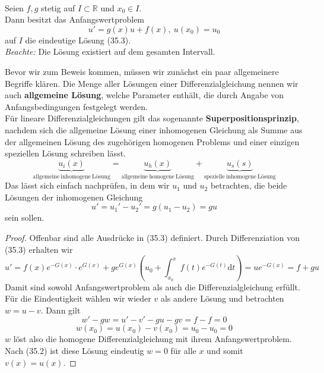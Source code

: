\ \\
\linebreak
\begin{satz}
Seien $f,g$ stetig auf $I\subset\mathbb{R}$ und $x_0\in I$. \\
Dann besitzt das Anfangswertproblem 
\begin{equation*}
u'=g(x)u+f(x),\ u(x_0)=u_0
\end{equation*}
auf $I$ die eindeutige Lösung (35.3).\\
\linebreak
\emph{Beachte:} Die Lösung existiert auf dem gesamten Intervall.
\end{satz}
Bevor wir zum Beweis kommen, müssen wir zunächst ein paar 
allgemeinere Begriffe klären. Die Menge aller Lösungen einer 
Differenzialgleichung nennen wir auch 
\textbf{allgemeine Lösung}, welche Parameter enthält, die 
durch Angabe von Anfangsbedingungen festgelegt werden. \\
Für lineare Differenzialgleichungen gilt das sogenannte 
\textbf{Superpositionsprinzip}, nachdem sich die allgemeine 
Lösung einer inhomogenen Gleichung als Summe aus der allgemeinen 
Lösung des zugehörigen homogenen Problems und einer einzigen 
speziellen Lösung schreiben lässt.
\begin{equation*}
\underbrace{u_{i}(x)}_{\mathrm{allgemeine\ inhomogene\ Lösung}}
= \underbrace{u_h(x)}_{\mathrm{allgemeine\ homogene\ Lösung}} + 
\underbrace{u_s(s)}_{\mathrm{spezielle\ inhomogene\ Lösung}}
\end{equation*}
Das lässt sich einfach nachprüfen, in dem wir $u_1$ und $u_2$ 
betrachten, die beide Lösungen der inhomogenen Gleichung
\begin{equation*}
u'=u_1'-u_2'=g(u_1-u_2)=gu
\end{equation*}
sein sollen.
\begin{proof}
Offenbar sind alle Ausdrücke in (35.3) definiert. Durch 
Differenziation von (35.3) erhalten wir
\begin{equation*}
u'=f(x)e^{-G(x)}\cdot e^{G(x)} + 
ge^{G(x)}\left(u_0+\int_{x_0}^x f(t)e^{-G(t)}\mathrm{d}t\right) 
= ue^{-G(x)}=f+gu
\end{equation*}
Damit sind sowohl Anfangswertproblem als auch die 
Differenzialgleichung erfüllt. Für die Eindeutigkeit 
wählen wir wieder $v$ als andere Lösung und betrachten $w=u-v$. 
Dann gilt
\begin{equation*}
w'-gw=u'-v'-gu-gv=f-f=0
\end{equation*}
\begin{equation*}
w(x_0)=u(x_0)-v(x_0)=u_0-u_0=0
\end{equation*}
$w$ löst also die homogene Differenzialgleichung mit ihrem 
Anfangswertproblem. Nach (35.2) ist diese Lösung eindeutig $w=0$ für alle $x$ und somit $v(x)=u(x)$.
\end{proof}